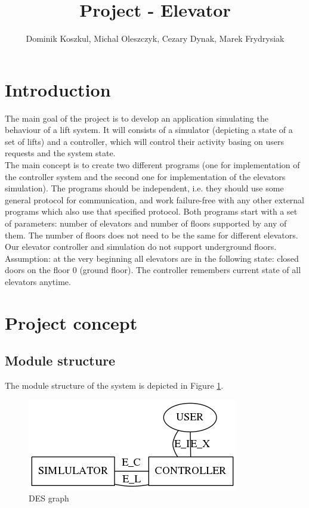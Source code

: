 \documentclass[12pt]{article}
\title{Project - Elevator}
\author{Dominik Koszkul, Michal Oleszczyk, Cezary Dynak, Marek Frydrysiak }
\begin{document}
\maketitle{}


\section{Introduction}
The main goal of the project is to develop an application simulating the behaviour of a lift system. It will consists of a simulator (depicting a state of a set of lifts) and a controller, which will control their activity basing on users requests and the system state.
\newline \\
The main concept is to create two different programs (one for implementation of the controller system and the second one for implementation of the elevators simulation). The programs should be independent, i.e. they should use some general protocol for communication, and work failure-free with any other external programs which also use that specified protocol. Both programs start with a set of parameters: number of elevators and number of floors supported by any of them. The number of floors does not need to be the same for different elevators. Our elevator controller and simulation do not support underground floors.
\newline
\newline
Assumption: at the very beginning all elevators are in the following state: closed doors on the floor 0 (ground floor). The controller remembers current state of all elevators anytime.

\section{Project concept}

\subsection{Module structure}

The module structure of the system is depicted in Figure \ref{fig:DES1}.

\begin{figure}[h!]
  \centering
  \includegraphics{img/simulator_controller.png}
  \caption{DES graph}
  \label{fig:DES1}
\end{figure}
\end{document}
